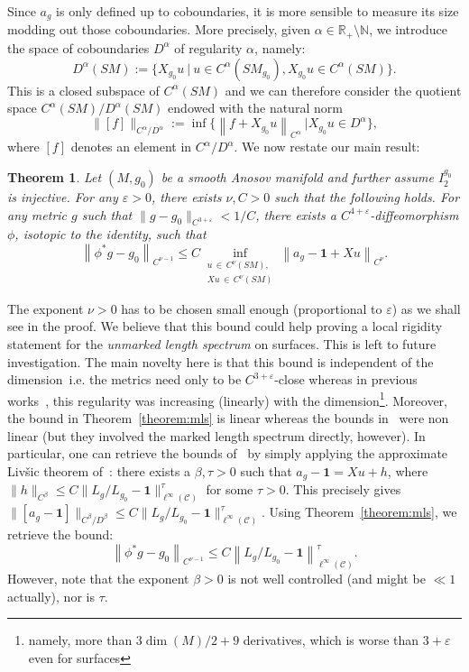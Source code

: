 \documentclass[10pt]{amsart}
\newtheorem{theo}{Theorem}[section]
\theoremstyle{definition}\newtheorem{defi}[theo]{Definition}\newtheorem{rema}[theo]{Remark}\newtheorem{exam}[theo]{Example}\newtheorem{exem}[theo]{Example}\newtheorem{nota}[theo]{Notation}
\newcommand{\R}{\mathbb{R}}
\newcommand{\N}{\mathbb{N}}
\newcommand{\bfun}{\mathbf{1}}
\newcommand{\eps}{\varepsilon}
\newcommand{\mc}{\mathcal}
\begin{document}
Since $a_g$ is only defined up to coboundaries, it is more sensible to measure its size modding out those coboundaries. More precisely, given $\alpha \in \R_+ \setminus \N$, we introduce the space of coboundaries $D^\alpha$ of regularity $\alpha$, namely:
\[
D^\alpha(SM) := \Big\{ X_{g_0} u~\Big|~u \in C^\alpha(SM_{g_0}), X_{g_0} u \in C^\alpha(SM) \Big\}.
\]
This is a closed subspace of $C^\alpha(SM)$ and we can therefore consider the quotient space $C^\alpha(SM)/D^\alpha(SM)$ endowed with the natural norm
\[
\|[f]\|_{C^\alpha/D^\alpha} := \inf\Big\{\left\|f + X_{g_0}u\right\|_{C^\alpha}\ \Big| X_{g_0} u \in D^\alpha \Big\},
\]
where $[f]$ denotes an element in $C^\alpha/D^\alpha$. We now restate our main result:

\begin{theo}\label{theorem:mlsx}
Let $(M,g_0)$ be a smooth Anosov manifold and further assume $I^{g_0}_2$ is injective. For any $\eps>0$, there exists $\nu, C > 0$ such that the following holds. For any metric $g$ such that $\|g-g_0\|_{C^{3+\eps}} < 1/C$, there exists a $C^{4+\eps}$-diffeomorphism $\phi$, isotopic to the identity, such that
\[
\left\| \phi^* g - g_0\right\|_{C^{\nu-1}} \leq C \inf_{\substack{u\,\in\,C^\nu(SM), \\
Xu\,\in\,C^\nu(SM)}} \left\|a_g-\bfun + Xu\right\|_{C^{\nu}}.
\]
\end{theo}

The exponent $\nu > 0$ has to be chosen small enough (proportional to $\eps$) as we shall see in the proof. We believe that this bound could help proving a local rigidity statement for the \emph{unmarked length spectrum} on surfaces. This is left to future investigation. The main novelty here is that this bound is independent of the dimension~i.e. the metrics need only to be $C^{3+\eps}$-close whereas in previous works~\cite{Guillarmou-Knieper-Lefeuvre-19,Guillarmou-Lefeuvre-18}, this regularity was increasing (linearly) with the dimension\footnote{namely, more than $3\dim(M)/2 + 9$ derivatives, which is worse than $3+\eps$ even for surfaces}. Moreover, the bound in Theorem~\ref{theorem:mls} is linear whereas the bounds in~\cite{Guillarmou-Knieper-Lefeuvre-19,Guillarmou-Lefeuvre-18} were non linear (but they involved the marked length spectrum directly, however). In particular, one can retrieve the bounds of~\cite{Guillarmou-Knieper-Lefeuvre-19,Guillarmou-Lefeuvre-18} by simply applying the approximate Liv{\v s}ic theorem of~\cite{Gouezel-Lefeuvre-19}: there exists a $\beta,\tau > 0$ such that $a_g-\bfun = Xu + h$, where $\|h\|_{C^\beta} \leq C \|L_g/L_{g_0}-\bfun\|_{\ell^\infty(\mc{C})}^\tau$ for some $\tau>0$. This precisely gives $\|[a_g-\bfun]\|_{C^\beta/D^\beta} \leq C \|L_g/L_{g_0}-\bfun\|_{\ell^\infty(\mc{C})}^\tau$. Using Theorem~\ref{theorem:mls}, we retrieve the bound:
\[
\left\| \phi^* g - g_0\right\|_{C^{\nu-1}} \leq C \left\|L_g/L_{g_0}-\bfun\right\|_{\ell^\infty(\mc{C})}^\tau.
\]
However, note that the exponent $\beta > 0$ is not well controlled (and might be $\ll 1$ actually), nor is $\tau$.
\end{document}
